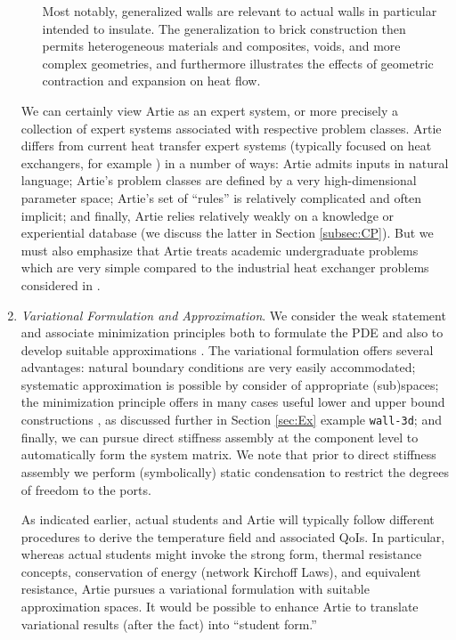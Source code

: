 \documentclass[preprint,12pt]{article}
\begin{document}
\begin{enumerate}
\begin{itemize}
Most notably, generalized walls are relevant to actual walls in particular intended to insulate. The generalization to brick construction then permits heterogeneous materials and composites, voids, and more complex geometries, and furthermore illustrates the effects of geometric contraction and expansion on heat flow.

\end{itemize}
We can certainly view Artie as an expert system, or more precisely a collection of expert systems associated with respective problem classes. Artie differs from current heat transfer expert systems (typically focused on heat exchangers, for example \cite{Afgan,Cochran}) in a number of ways: Artie admits inputs in natural language; Artie's problem classes are defined by a very high-dimensional parameter space; Artie's set of ``rules'' is  relatively complicated and often implicit; and finally, Artie relies relatively weakly on a knowledge or experiential database (we discuss the latter in Section \ref{subsec:CP}). But we must also emphasize that Artie treats academic undergraduate problems which are very simple compared to the industrial heat exchanger problems considered in \cite{Cochran,Afgan}.

\item {\em Variational Formulation and Approximation}. We consider the weak statement and associate minimization principles both to formulate the PDE and also to develop suitable approximations \cite{QandV}.  The variational formulation offers several advantages: natural boundary conditions are very easily accommodated; systematic approximation is possible by consider of appropriate (sub)spaces; the minimization principle offers in many cases useful lower and upper bound constructions \cite{bounds_us,bounds_Elrod}, as discussed further in Section \ref{sec:Ex} example \texttt{wall-3d}; and finally, we can pursue direct stiffness assembly \cite{Bab} at the component level to automatically form the system matrix. We note that prior to direct stiffness assembly we perform (symbolically) static condensation \cite{Wi_IJNME} to restrict the degrees of freedom to the ports.

As indicated earlier, actual students and Artie will typically follow different procedures to derive the temperature field and associated QoIs. In particular, whereas actual students might invoke the strong form, thermal resistance concepts, conservation of energy (network Kirchoff Laws), and equivalent resistance, Artie pursues a variational formulation with suitable approximation spaces. It would be possible to enhance Artie to translate variational results (after the fact) into ``student form.'' 
\end{enumerate}
\end{document}
